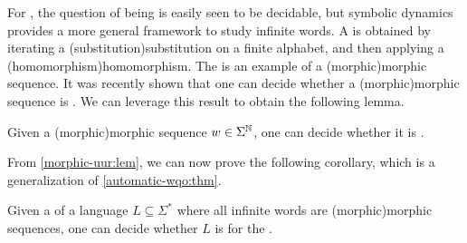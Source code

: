 
\AP
For , the question of being  is easily seen to be decidable, but symbolic dynamics provides a
more general framework to study infinite words. A  is
obtained by iterating a \kl(substitution){substitution} on a finite alphabet,
and then applying a \kl(homomorphism){homomorphism}. The  is an example of a \kl(morphic){morphic sequence}.
It was recently shown that one can decide whether a \kl(morphic){morphic
sequence} is  \cite[Theorem 1]{DURAND13}.
We can leverage this result to obtain the following lemma.

\begin{lemma}
  \label{morphic-uur:lem}
    Given a \kl(morphic){morphic sequence} $w \in \Sigma^{\mathbb{N}}$, one can decide
    whether it is .
\end{lemma}

From \cref{morphic-uur:lem}, we can now prove the following corollary,
which is a generalization of \cref{automatic-wqo:thm}.

\begin{corollary}
    \label{morphic-wqo:cor}
    Given a  of a language $L \subseteq
    \Sigma^*$ where all infinite words are \kl(morphic){morphic sequences}, one can
    decide whether $L$ is  for the .
\end{corollary} 


